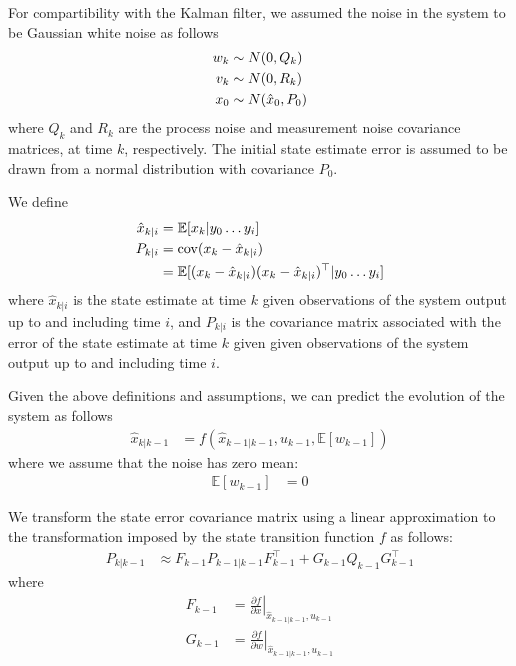 \documentclass[]{article}
\begin{document}
{For compartibility with the Kalman filter, we assumed the noise in the system to be Gaussian white noise as follows
\begin{align}
	w_k &\sim N(0,Q_k) \notag \\
	v_k &\sim N(0,R_k) \notag \\
	x_0 &\sim N(\hat{x}_0,P_0)
	\label{eqn:noisedef}
\end{align}
where $Q_k$ and $R_k$ are the process noise and measurement noise covariance matrices, at time $k$, respectively. The initial state estimate error is assumed to be drawn from a normal distribution with covariance $P_0$.

We define
\begin{align}
	\hat{x}_{k|i} 	&= \mathbb{E}[x_k|y_0 \hdots y_i] \\
	P_{k|i} 		&= \operatorname{cov}(x_k - \hat{x}_{k|i}) \notag \\
					&= \mathbb{E}[ (x_k-\hat{x}_{k|i}) (x_k-\hat{x}_{k|i})^\top | y_0 \hdots y_i]
\end{align}
where $\hat{x}_{k|i}$ is the state estimate at time $k$ given observations of the system output up to and including time $i$, and $P_{k|i}$ is the covariance matrix associated with the error of the state estimate at time $k$ given given observations of the system output up to and including time $i$.

Given the above definitions and assumptions, we can predict the evolution of the system as follows
\begin{align}
	\hat{x}_{k|k-1} &= f(\hat{x}_{k-1|k-1}, u_{k-1}, \mathbb{E}[w_{k-1}])
	\label{eqn:predictx}
\end{align}
where we assume that the noise has zero mean:
\begin{align}
	\mathbb{E}[w_{k-1}] &= 0
\end{align}

We transform the state error covariance matrix using a linear approximation to the transformation imposed by the state transition function $f$ as follows:
\begin{align}
	P_{k|k-1} &\approx F_{k-1} P_{k-1|k-1} F_{k-1}^\top + G_{k-1} Q_{k-1} G_{k-1}^\top
	\label{eqn:predictP}
\end{align}
where
\begin{align}
	F_{k-1} &= \left . \frac{\partial f}{\partial x} \right \vert _{\hat{x}_{k-1|k-1},u_{k-1}} \\
	G_{k-1} &= \left . \frac{\partial f}{\partial w} \right \vert _{\hat{x}_{k-1|k-1},u_{k-1}}
\end{align}

}
\end{document}
